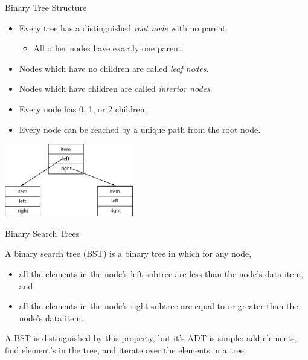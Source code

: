 \documentclass{beamer}
\begin{document}
\begin{frame}[fragile]{Binary Tree Structure}



\begin{itemize}
\item Every tree has a distinguished {\it root node} with no parent.
\begin{itemize}
\item All other nodes have exactly one parent.
\end{itemize}
\item Nodes which have no children are called {\it leaf nodes}.
\item Nodes which have children are called {\it interior nodes}.
\item Every node has 0, 1, or 2 children.
\item Every node can be reached by a unique path from the root node.
\end{itemize}

\begin{center}
\includegraphics[height=1.25in]{binary-tree.png}
\end{center}


\end{frame}

\begin{frame}[fragile]{Binary Search Trees}


A binary search tree (BST) is a binary tree in which for any node,
\begin{itemize}
\item all the elements in the node's left subtree are less than the node's data item, and
\item all the elements in the node's right subtree are equal to or greater than the node's data item.
\end{itemize}

A BST is distinguished by this property, but it's ADT is simple: add elements, find element's in the tree, and iterate over the elements in a tree.


\end{frame}
\end{document}
